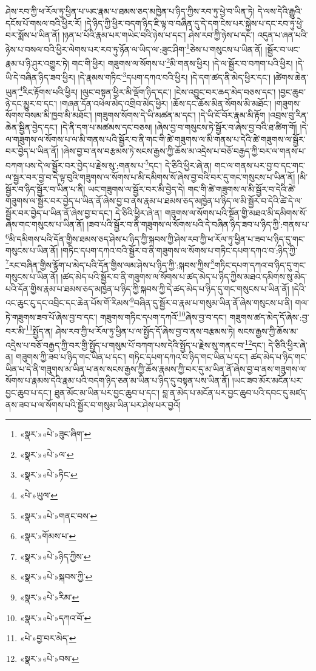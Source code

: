 ཤེས་རབ་ཀྱི་ཕ་རོལ་ཏུ་ཕྱིན་པ་ཡང་རྣམ་པ་ཐམས་ཅད་མཁྱེན་པ་ཉིད་ཀྱིས་རབ་ཏུ་ཕྱེ་བ་ཡིན་ཏེ། དེ་ལས་དེའི་རྒྱུའི་དངོས་པོ་གསལ་བའི་ཕྱིར་རོ། །དེ་ཉིད་ཀྱི་ཕྱིར་བདག་ཉིད་ཇི་ལྟ་བ་བཞིན་དུ་དེ་དག་ངེས་པར་སྐྱེས་པ་དང་རབ་ཏུ་ཕྱེ་བར་སྨོས་པ་ཡིན་ནོ། །ཉན་པ་པོའི་རྣམ་པར་གཡེང་བའི་ཉེས་པ་དང་། ཤེས་རབ་ཀྱི་ཉེས་པ་དང་། འདུན་པ་ཞན་པའི་ཉེས་པ་བསལ་བའི་ཕྱིར་ལེགས་པར་རབ་ཏུ་ཉོན་ལ་ཡིད་ལ་:ཟུང་ཤིག་\footnote{«སྣར་»«པེ་»ཟུང་ཞིག་}ཅེས་པ་གསུངས་པ་ཡིན་ནོ། །སྦྱོར་བ་ཡང་རྣམ་པ་ཉི་ཤུར་འགྱུར་ཏེ། གང་གི་ཕྱིར། གཟུགས་ལ་སོགས་པ་\footnote{«སྣར་»«པེ་»ལ་}མི་གནས་ཕྱིར། །དེ་ལ་སྦྱོར་བ་བཀག་པའི་ཕྱིར། །དེ་ཡི་དེ་བཞིན་ཉིད་ཟབ་ཕྱིར། །དེ་རྣམས་གཏིང་\footnote{«སྣར་»«པེ་»ཏིང་}དཔག་དཀའ་བའི་ཕྱིར། །དེ་དག་ཚད་ནི་མེད་ཕྱིར་དང་། །ཚེགས་ཆེན་ཡུན་\footnote{«པེ་»ཡུལ་}རིང་རྟོགས་པའི་ཕྱིར། །ལུང་བསྟན་ཕྱིར་མི་ལྡོག་ཉིད་དང་། །ངེས་འབྱུང་བར་ཆད་མེད་བཅས་དང་། །བྱང་ཆུབ་ཉེ་དང་མྱུར་བ་དང་། །གཞན་དོན་འཕེལ་མེད་འགྲིབ་མེད་ཕྱིར། །ཆོས་དང་ཆོས་མིན་སོགས་མི་མཐོང་། །གཟུགས་སོགས་བསམ་མི་ཁྱབ་མི་མཐོང་། །གཟུགས་སོགས་དེ་ཡི་མཚན་མ་དང་། །དེ་ཡི་ངོ་བོར་རྣམ་མི་རྟོག །འབྲས་བུ་རིན་ཆེན་སྦྱིན་བྱེད་དང་། །དེ་ནི་དག་པ་མཚམས་དང་བཅས། །ཞེས་བྱ་བ་གསུངས་ཏེ་སྦྱོར་བ་ཞེས་བྱ་བའི་ཐ་ཚིག་གོ། །དེ་ལ་གཟུགས་ལ་སོགས་པ་ལ་མི་གནས་པའི་སྦྱོར་བ་ནི་གང་གི་ཚེ་གཟུགས་ལ་མི་གནས་པ་དེའི་ཚེ་གཟུགས་ལ་སྦྱོར་བར་བྱེད་པ་ཡིན་ནོ། །ཞེས་བྱ་བ་ནས་བརྩམས་ཏེ་སངས་རྒྱས་ཀྱི་ཆོས་མ་འདྲེས་པ་བཅོ་བརྒྱད་ཀྱི་བར་ལ་གནས་པ་བཀག་པས་དེ་ལ་སྦྱོར་བར་བྱེད་པ་རྗེས་སུ་:གནས་པ་\footnote{«སྣར་»«པེ་»གནང་བས་}དང་། དེ་ཅིའི་ཕྱིར་ཞེ་ན། གང་ལ་གནས་པར་བྱ་བ་དང་གང་ལ་སྦྱར་བར་བྱ་བ་དེ་ལྟ་བུའི་གཟུགས་ལ་སོགས་པ་མི་དམིགས་སོ་ཞེས་བྱ་བའི་བར་དུ་གང་གསུངས་པ་ཡིན་ནོ། །མི་སྦྱོར་བ་ཉིད་སྦྱོར་བ་ཡིན་པ་ནི། ཡང་གཟུགས་ལ་སྦྱོར་བར་མི་བྱེད་དེ། གང་གི་ཚེ་གཟུགས་ལ་མི་སྦྱོར་བ་དེའི་ཚེ་གཟུགས་ལ་སྦྱོར་བར་བྱེད་པ་ཡིན་ནོ་ཞེས་བྱ་བ་ནས་རྣམ་པ་ཐམས་ཅད་མཁྱེན་པ་ཉིད་ལ་མི་སྦྱོར་བ་དེའི་ཚེ་དེ་ལ་སྦྱོར་བར་བྱེད་པ་ཡིན་ནོ་ཞེས་བྱ་བ་དང་། དེ་ཅིའི་ཕྱིར་ཞེ་ན། གཟུགས་ལ་སོགས་པའི་སྔོན་གྱི་མཐའ་མི་དམིགས་སོ་ཞེས་གང་གསུངས་པ་ཡིན་ནོ། །ཟབ་པའི་སྦྱོར་བ་ནི་གཟུགས་ལ་སོགས་པའི་དེ་བཞིན་ཉིད་ཟབ་པ་ཉིད་ཀྱི་:གནས་པ་\footnote{«སྣར་»གོམས་པ་}མི་དམིགས་པའི་དོན་གྱིས་ཐམས་ཅད་ཤེས་པ་ཉིད་ཀྱི་སྐབས་ཀྱི་ཤེས་རབ་ཀྱི་ཕ་རོལ་ཏུ་ཕྱིན་པ་ཟབ་པ་ཉིད་དུ་གང་གསུངས་པ་ཡིན་ནོ། །གཏིང་དཔག་དཀའ་བའི་སྦྱོར་བ་ནི་གཟུགས་ལ་སོགས་པ་གཏིང་དཔག་དཀའ་བ་:ཉིད་ཀྱི་\footnote{«སྣར་»«པེ་»ཉིད་ཀྱིས་}རང་བཞིན་གྱིས་རྙོག་པ་མེད་པའི་དོན་གྱིས་ལམ་ཤེས་པ་ཉིད་ཀྱི་:སྐབས་ཀྱིས་\footnote{«སྣར་»«པེ་»སྐབས་ཀྱི་}གཏིང་དཔག་དཀའ་བ་ཉིད་དུ་གང་གསུངས་པ་ཡིན་ནོ། །ཚད་མེད་པའི་སྦྱོར་བ་ནི་གཟུགས་ལ་སོགས་པ་ཚད་མེད་པ་ཉིད་ཀྱིས་མཐའ་དམིགས་སུ་མེད་པའི་དོན་གྱིས་རྣམ་པ་ཐམས་ཅད་མཁྱེན་པ་ཉིད་ཀྱི་སྐབས་ཀྱི་དེ་ཚད་མེད་པ་ཉིད་དུ་གང་གསུངས་པ་ཡིན་ནོ། །དེའི་འང་ཆུང་ངུ་དང་འབྲིང་དང་ཆེན་པོས་གོ་རིམས་\footnote{«སྣར་»«པེ་»རིམ་}བཞིན་དུ་སྦྱོར་བ་རྣམ་པ་གསུམ་ཡིན་ནོ་ཞེས་གསུངས་པ་ནི། གལ་ཏེ་གཟུགས་ཟབ་པོ་ཞེས་བྱ་བ་དང་། གཟུགས་གཏིང་དཔག་དཀའོ་\footnote{«སྣར་»«པེ་»དཀའ་བོ་}ཞེས་བྱ་བ་དང་། གཟུགས་ཚད་མེད་དོ་ཞེས་:བྱ་བར་མི་\footnote{«པེ་»བྱ་བར་མེད་}སྤྱོད་ན། ཤེས་རབ་ཀྱི་ཕ་རོལ་ཏུ་ཕྱིན་པ་ལ་སྤྱོད་དོ་ཞེས་བྱ་བ་ནས་བརྩམས་ཏེ། སངས་རྒྱས་ཀྱི་ཆོས་མ་འདྲེས་པ་བཅོ་བརྒྱད་ཀྱི་བར་གྱི་སྤྱོད་པ་གསུམ་པོ་བཀག་པས་དེའི་སྤྱོད་པ་རྗེས་སུ་གནང་བ་\footnote{«སྣར་»«པེ་»བས་}དང་། དེ་ཅིའི་ཕྱིར་ཞེ་ན། གཟུགས་ཀྱི་ཟབ་པ་ཉིད་གང་ཡིན་པ་དང་། གཏིང་དཔག་དཀའ་བ་ཉིད་གང་ཡིན་པ་དང་། ཚད་མེད་པ་ཉིད་གང་ཡིན་པ་དེ་ནི་གཟུགས་མ་ཡིན་པ་ནས་སངས་རྒྱས་ཀྱི་ཆོས་རྣམས་ཀྱི་བར་དུ་མ་ཡིན་ནོ་ཞེས་བྱ་བ་ནས་གཟུགས་ལ་སོགས་པ་རྣམས་དེའི་རྣམ་པའི་བདག་ཉིད་ཅན་མ་ཡིན་པ་ཉིད་དུ་བསྟན་པས་ཡིན་ནོ། །ཡང་ཟབ་མོར་མངོན་པར་བྱང་ཆུབ་པ་དང་། ཐུན་མོང་མ་ཡིན་པར་བྱང་ཆུབ་པ་དང་། བླ་ན་མེད་པ་མངོན་པར་བྱང་ཆུབ་པའི་དབང་དུ་མཛད་ནས་ཟབ་པ་ལ་སོགས་པའི་སྦྱོར་བ་གསུམ་ཡིན་པར་ཤེས་པར་བྱའོ། 